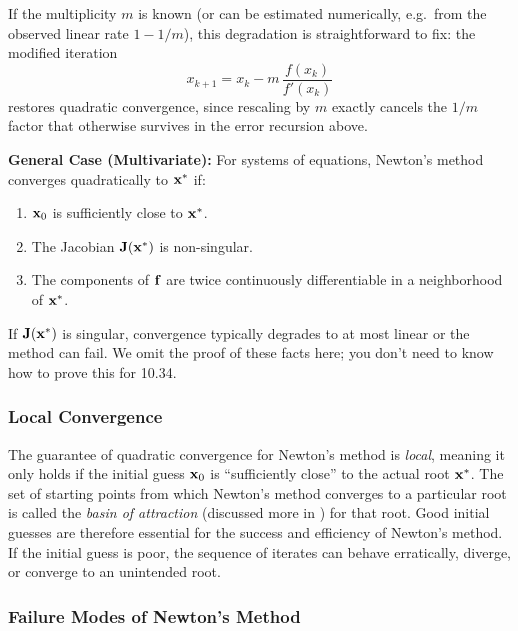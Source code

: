 If the multiplicity $m$ is known (or can be estimated numerically, e.g.\ from the observed linear rate $1-1/m$), this degradation is straightforward to fix: the modified iteration
\begin{equation}
    x_{k+1} = x_k - m\,\frac{f(x_k)}{f'(x_k)}
\end{equation}
restores quadratic convergence, since rescaling by $m$ exactly cancels the $1/m$ factor that otherwise survives in the error recursion above.


\textbf{General Case (Multivariate):}
For systems of equations, Newton's method converges quadratically to $\mathbf{x}^*$ if:
\begin{enumerate}
    \item $\mathbf{x}_0$ is sufficiently close to $\mathbf{x}^*$.
    \item The Jacobian $\mathbf{J}(\mathbf{x}^*)$ is non-singular.
    \item The components of $\mathbf{f}$ are twice continuously differentiable in a neighborhood of $\mathbf{x}^*$.
\end{enumerate}
If $\mathbf{J}(\mathbf{x}^*)$ is singular, convergence typically degrades to at most linear or the method can fail. We omit the proof of these facts here; you don't need to know how to prove this for 10.34.

\subsubsection{Local Convergence}
The guarantee of quadratic convergence for Newton's method is \textit{local}, meaning it only holds if the initial guess $\mathbf{x}_0$ is ``sufficiently close'' to the actual root $\mathbf{x}^*$. The set of starting points from which Newton's method converges to a particular root is called the \textit{basin of attraction} (discussed more in ) for that root. Good initial guesses are therefore essential for the success and efficiency of Newton's method. If the initial guess is poor, the sequence of iterates can behave erratically, diverge, or converge to an unintended root.


\subsubsection{Failure Modes of Newton's Method}
\label{sec:failure_modes_newton}

